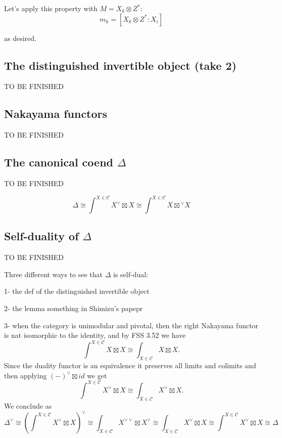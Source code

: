 \documentclass[11pt]{article}
\newcommand{\C}{\mathcal{C}}
\theoremstyle{definition}
\begin{document}
Let's apply this property with \( M = X_k \otimes Z^* \):
\[
m_k = [X_k \otimes Z^* : X_i]
\]

as desired.


\subsection{The distinguished invertible object (take 2)}

{\color{red} TO BE FINISHED }



\subsection{Nakayama functors}

{\color{red} TO BE FINISHED }






\subsection{The canonical coend $\Delta$}
{\color{red} TO BE FINISHED }



$$ \Delta \cong \int^{X \in \C} X^\vee \boxtimes X \cong \int^{X \in \C} X \boxtimes {}^\vee X$$


\subsection{Self-duality of $\Delta$}
{\color{red} TO BE FINISHED }

Three different ways to see that $\Delta $ is self-dual:

1- the def of the distinguished invertible object

2- the lemma something in Shimizu's papepr

3- when the category is unimodular and pivotal, then the right Nakayama functor is nat isomorphic to the identity, and by FSS 3.52 we have $$ \int^{X \in \C} X \boxtimes X \cong  \int_{X \in \C} X \boxtimes X.$$ Since the duality functor is an equivalence it preserves all limits and colimits and then applying $(-)^\vee \boxtimes id$ we get
$$ \int^{X \in \C} X^\vee \boxtimes X \cong  \int_{X \in \C} X^\vee \boxtimes X.$$
We conclude as 
$$  \Delta^\vee \cong \left( \int^{X \in \C} X^\vee \boxtimes X  \right)^\vee \cong   \int_{X \in \C} X^{\vee \vee} \boxtimes X^\vee \cong    \int_{X \in \C} X^\vee \boxtimes X \cong   \int^{X \in \C} X^\vee \boxtimes X \cong \Delta $$
\end{document}

